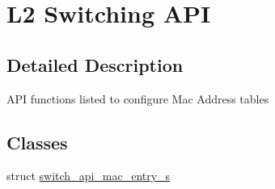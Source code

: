 \hypertarget{group__L2}{\section{L2 Switching A\+P\+I}
\label{group__L2}
}


\subsection{Detailed Description}
A\+P\+I functions listed to configure Mac Address tables \subsection*{Classes}
\begin{DoxyCompactItemize}
\item 
struct \hyperlink{structswitch__api__mac__entry__s}{switch\+\_\+api\+\_\+mac\+\_\+entry\+\_\+s}
\end{DoxyCompactItemize}
